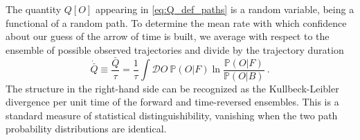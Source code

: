 The quantity $Q[O]$ appearing in \eqref{eq:Q_def_paths} is a random variable, being a functional of a random path. To determine the mean rate with which confidence about our guess of the arrow of time is built, we average with respect to the ensemble of possible observed trajectories and divide by the trajectory duration
%
\begin{equation}
    \dot{\bar{Q}} \equiv \frac{\bar{Q}}{\tau} = \frac{1}{\tau} \int \mathcal{D}O \ \mathbb{P}(O|F) \ln \frac{\mathbb{P}(O|F)}{\mathbb{P}(O|B)}~.
\end{equation}
%
The structure in the right-hand side can be recognized as the Kullbeck-Leibler divergence \cite{kullback1951information} per unit time of the forward and time-reversed ensembles. This is a standard measure of statistical distinguishibility, vanishing when the two path probability distributions are identical. \\

